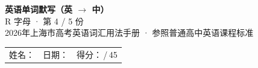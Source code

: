 \documentclass[10pt,a4paper]{article}
\begin{document}
\pagestyle{plain}

\begin{center}
{\LARGE\bfseries 英语单词默写（英 $\to$ 中）}\\[0.22em]
{\large R 字母 · 第 4 / 5 份}\\[0.18em]
{\small 2026年上海市高考英语词汇用法手册 · 参照普通高中英语课程标准}
\end{center}

\vspace{0.25em}
\noindent\begin{tabular}{@{}p{}@{}p{}@{}p{}@{}}
姓名：\underline{\hspace{2.0cm}} & 日期：\underline{\hspace{2.0cm}} & 得分：\underline{\hspace{1.3cm}}\,/\,45 \\
\end{tabular}

\vspace{0.3em}

\vspace{0.08em}
\end{document}
